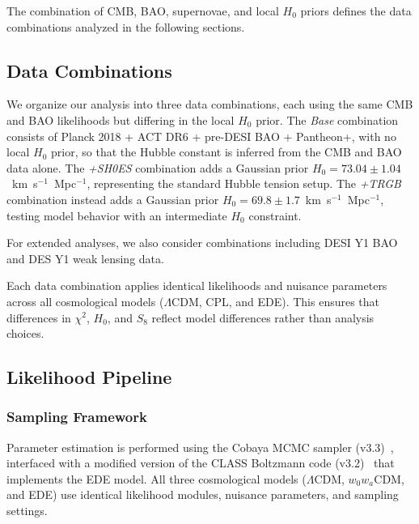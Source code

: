 \documentclass[a4paper,11pt]{article}
\begin{document}
The combination of CMB, BAO, supernovae, and local $H_0$ priors defines the data combinations analyzed in the following sections.


\subsection{Data Combinations}
\label{sec:worlds}

We organize our analysis into three data combinations, each using the same CMB and BAO likelihoods but differing in the local $H_0$ prior. The \emph{Base} combination consists of Planck 2018 + ACT DR6 + pre-DESI BAO + Pantheon+, with no local $H_0$ prior, so that the Hubble constant is inferred from the CMB and BAO data alone. The \emph{+SH0ES} combination adds a Gaussian prior $H_0 = 73.04 \pm 1.04$~km~s$^{-1}$~Mpc$^{-1}$, representing the standard Hubble tension setup. The \emph{+TRGB} combination instead adds a Gaussian prior $H_0 = 69.8 \pm 1.7$~km~s$^{-1}$~Mpc$^{-1}$, testing model behavior with an intermediate $H_0$ constraint.

For extended analyses, we also consider combinations including DESI Y1 BAO and DES Y1 weak lensing data.

Each data combination applies identical likelihoods and nuisance parameters across all cosmological models ($\Lambda$CDM, CPL, and EDE). This ensures that differences in $\chi^2$, $H_0$, and $S_8$ reflect model differences rather than analysis choices.


\subsection{Likelihood Pipeline}
\label{sec:pipeline}

\subsubsection{Sampling Framework}
Parameter estimation is performed using the Cobaya MCMC sampler (v3.3)~\cite{Cobaya}, interfaced with a modified version of the CLASS Boltzmann code (v3.2)~\cite{CLASS} that implements the EDE model. All three cosmological models ($\Lambda$CDM, $w_0 w_a$CDM, and EDE) use identical likelihood modules, nuisance parameters, and sampling settings.
\end{document}
